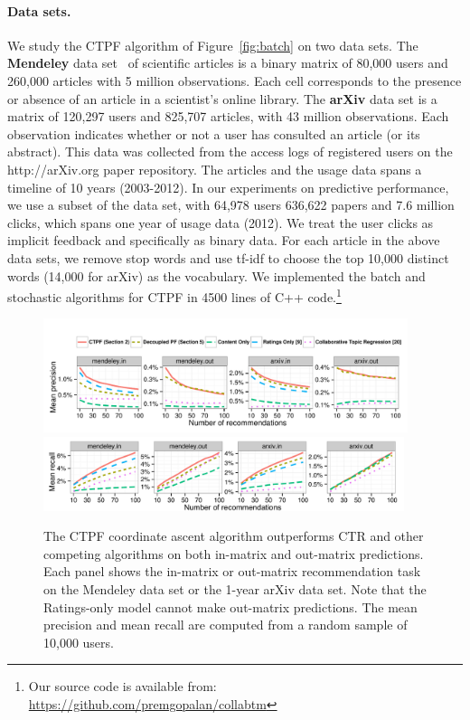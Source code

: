 \documentclass{article}
\newcommand{\myfig}[1]{Figure~\ref{fig:#1}}
\begin{document}
\paragraph{Data sets.} We study the CTPF algorithm of \myfig{batch} on
two data sets.  The {\bf Mendeley} data set~\cite{Jack:2010} of
scientific articles is a binary matrix of 80,000 users and 260,000
articles with 5 million observations. Each cell corresponds to the
presence or absence of an article in a scientist's online library. The
{\bf arXiv} data set is a matrix of 120,297 users and 825,707
articles, with 43 million observations. Each observation indicates
whether or not a user has consulted an article (or its abstract). This
data was collected from the access logs of registered users on the
http://arXiv.org paper repository.  The articles and the usage data
spans a timeline of 10 years (2003-2012).  In our experiments on
predictive performance, we use a subset of the data set, with 64,978
users 636,622 papers and 7.6 million clicks, which spans one year of
usage data (2012). We treat the user clicks as implicit feedback and
specifically as binary data. For each article in the above data sets,
we remove stop words and use tf-idf to choose the top 10,000 distinct
words (14,000 for arXiv) as the vocabulary. We implemented the batch
and stochastic algorithms for CTPF in 4500 lines of C++
code.\footnote{Our source code is available from:
  \url{https://github.com/premgopalan/collabtm}}

\begin{figure}[!]
\centering
\includegraphics[width=0.95\textwidth]{../fig/pdf/mean_precision_by_num_recs.pdf}
\includegraphics[width=0.94\textwidth]{../fig/pdf/mean_recall_by_num_recs.pdf}\\
\caption{
\footnotesize{The CTPF coordinate ascent algorithm outperforms CTR and
  other competing algorithms on both in-matrix and out-matrix
  predictions. Each panel shows the in-matrix or out-matrix
  recommendation task on the Mendeley data set or the 1-year arXiv
  data set. Note that the Ratings-only model cannot make out-matrix
  predictions. The mean precision and mean recall are computed from a
  random sample of 10,000 users.}}
\label{fig:precision_recall_at_20}
\vspace{-0.6cm}
\end{figure}
\end{document}
